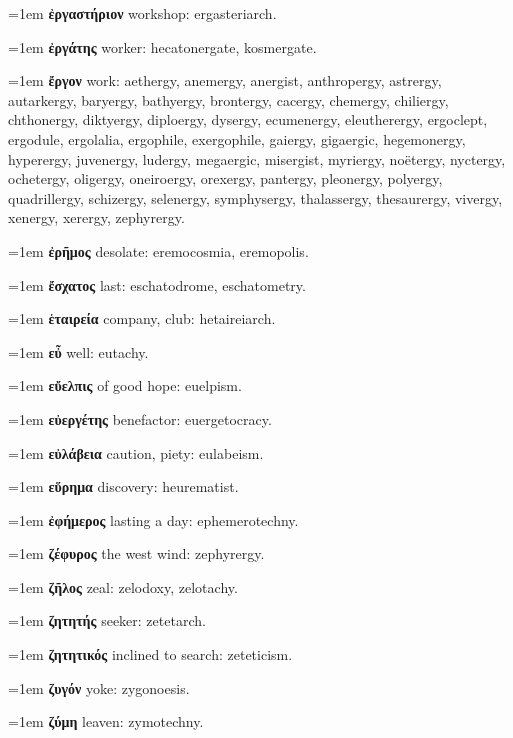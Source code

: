\hangindent=1em \textbf{ἐργαστήριον} workshop: ergasteriarch.\par
\hangindent=1em \textbf{ἐργάτης} worker: hecatonergate, kosmergate.\par
\hangindent=1em \textbf{ἔργον} work: aethergy, anemergy, anergist, anthropergy, astrergy, autarkergy, baryergy, bathyergy, brontergy, cacergy, chemergy, chiliergy, chthonergy, diktyergy, diploergy, dysergy, ecumenergy, eleutherergy, ergoclept, ergodule, ergolalia, ergophile, exergophile, gaiergy, gigaergic, hegemonergy, hyperergy, juvenergy, ludergy, megaergic, misergist, myriergy, noëtergy, nyctergy, ochetergy, oligergy, oneiroergy, orexergy, pantergy, pleonergy, polyergy, quadrillergy, schizergy, selenergy, symphysergy, thalassergy, thesaurergy, vivergy, xenergy, xerergy, zephyrergy.\par
\hangindent=1em \textbf{ἐρῆμος} desolate: eremocosmia, eremopolis.\par
\hangindent=1em \textbf{ἔσχατος} last: eschatodrome, eschatometry.\par
\hangindent=1em \textbf{ἑταιρεία} company, club: hetaireiarch.\par
\hangindent=1em \textbf{εὖ} well: eutachy.\par
\hangindent=1em \textbf{εὔελπις} of good hope: euelpism.\par
\hangindent=1em \textbf{εὐεργέτης} benefactor: euergetocracy.\par
\hangindent=1em \textbf{εὐλάβεια} caution, piety: eulabeism.\par
\hangindent=1em \textbf{εὕρημα} discovery: heurematist.\par
\hangindent=1em \textbf{ἐφήμερος} lasting a day: ephemerotechny.\par
\hangindent=1em \textbf{ζέφυρος} the west wind: zephyrergy.\par
\hangindent=1em \textbf{ζῆλος} zeal: zelodoxy, zelotachy.\par
\hangindent=1em \textbf{ζητητής} seeker: zetetarch.\par
\hangindent=1em \textbf{ζητητικός} inclined to search: zeteticism.\par
\hangindent=1em \textbf{ζυγόν} yoke: zygonoesis.\par
\hangindent=1em \textbf{ζύμη} leaven: zymotechny.\par

